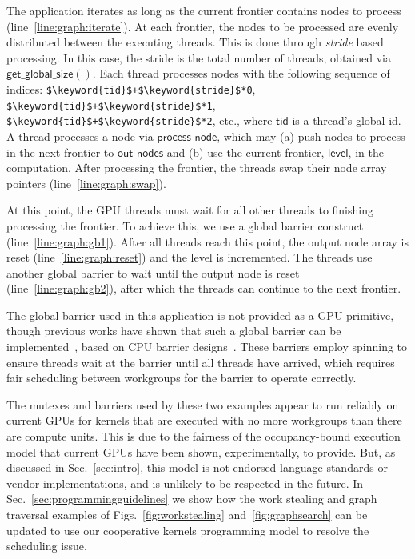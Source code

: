 \documentclass[numbers,nocopyrightspace,10pt]{sigplanconf}
\newcommand{\myfigs}{Figs.~}
\newcommand{\mysec}{Sec.~}
\newcommand{\code}[1]{\lstset{basicstyle=\tt}\lstinline!#1!\lstset{basicstyle=\scriptsize\tt}}
\newcommand{\getglobalsize}{\mathsf{get\_global\_size}}
\newcommand{\keyword}[1]{\mathsf{#1}}
\begin{document}
The application iterates as long as the current frontier contains
nodes to process (line~\ref{line:graph:iterate}). At each frontier,
the nodes to be processed are evenly distributed between the executing
threads. This is done through \emph{stride} based processing. 
%
In this case, the stride is the total number of threads, obtained via 
$\getglobalsize()$.  Each thread processes nodes with the following sequence of indices:
\code{$\keyword{tid}$+$\keyword{stride}$*0},
\code{$\keyword{tid}$+$\keyword{stride}$*1},
\code{$\keyword{tid}$+$\keyword{stride}$*2}, etc., where $\keyword{tid}$ is a thread's global id.
A thread processes a node via $\keyword{process\_node}$, which may (a) push nodes to process in the next frontier to
$\keyword{out\_nodes}$ and (b) use the current frontier, $\keyword{level}$, in
the computation. After processing the frontier, the threads swap their
node array pointers (line~\ref{line:graph:swap}).

At this point, the GPU threads must wait for all other threads to
finishing processing the frontier. To achieve
this, we use a global barrier construct
(line~\ref{line:graph:gb1}). After all threads reach this point, the
output node array is reset (line~\ref{line:graph:reset}) and the level
is incremented. The threads use another global barrier to wait until the output node is
reset (line~\ref{line:graph:gb2}), after which the threads can continue to the next frontier.

The global barrier used in this application is not provided as a GPU
primitive, though previous works have shown that such a global
barrier can be implemented~\cite{XF10,DBLP:conf/oopsla/SorensenDBGR16},
based on CPU barrier designs~\cite[ch. 17]{HS08}.
 These barriers employ spinning to ensure threads wait at the barrier until all
threads have arrived, which requires fair
scheduling between workgroups for the barrier to operate correctly.

The mutexes and barriers used by these two examples appear to run
reliably on current GPUs for kernels that are executed with no more
workgroups than there are compute units.  This is due to the fairness
of the occupancy-bound execution model that current GPUs have been
shown, experimentally, to provide.  But, as discussed in
\mysec\ref{sec:intro}, this model is not endorsed
language standards or vendor implementations, and is unlikely to be respected in the future.
%
In \mysec\ref{sec:programmingguidelines} we show how the work stealing
and graph traversal examples of \myfigs\ref{fig:workstealing} and~\ref{fig:graphsearch} can be
updated to use our cooperative kernels programming model to resolve
the scheduling issue.
\end{document}
